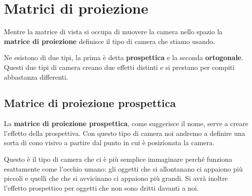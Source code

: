 \section{Matrici di proiezione}
Mentre la matrice di vista si occupa di muovere la camera nello spazio la \textbf{matrice di proiezione} definisce il
tipo di camera che stiamo usando.

Ne esistono di due tipi, la prima \`e detta \textbf{prospettica} e la seconda \textbf{ortogonale}. Questi due tipi di
camera creano due effetti distinti e si prestano per compiti abbastanza differenti.

\subsection{Matrice di proiezione prospettica}
La \textbf{matrice di proiezione prospettica}, come suggerisce il nome, serve a creare l'effetto della prospettiva.
Con questo tipo di camera noi andremo a definire una sorta di cono visivo a partire dal punto in cui \`e posizionata
la camera.

Questo \`e il tipo di camera che ci \`e pi\`u semplice immaginare perch\'e funziona esattamente come l'occhio umano: gli
oggetti che si allontanano ci appaiono pi\`u piccoli e quelli che che si avvicinano ci appaiono pi\`u grandi. Si avr\`a
inoltre l'effetto prospettico per oggetti che non sono dritti davanti a noi.

\begin{center}
\end{center}
